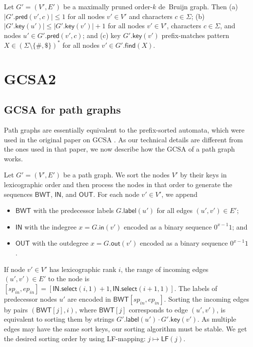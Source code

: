 \documentclass[a4paper,UKenglish]{lipics-v2016}
\newcommand{\set}[1]{\ensuremath{\{ #1 \}}}
\newcommand{\abs}[1]{\ensuremath{\lvert #1 \rvert}}
\newcommand{\select}{\ensuremath{\mathsf{select}}}
\newcommand{\LF}{\ensuremath{\mathsf{LF}}}
\newcommand{\find}{\ensuremath{\mathsf{find}}}
\newcommand{\gindegree}{\ensuremath{\mathsf{in}}}
\newcommand{\goutdegree}{\ensuremath{\mathsf{out}}}
\newcommand{\glabel}{\ensuremath{\mathsf{label}}}
\newcommand{\gpred}{\ensuremath{\mathsf{pred}}}
\newcommand{\gkey}{\ensuremath{\mathsf{key}}}
\newcommand{\orderk}[1]{order\nobreakdash-$#1$}
\newcommand{\LFmapping}{LF\nobreakdash-mapping}
\newcommand{\patternset}{\ensuremath{(\Sigma \setminus \set{\#, \$})^{\ast}}}
\newcommand{\BWT}{\ensuremath{\mathsf{BWT}}}
\newcommand{\bvIN}{\ensuremath{\mathsf{IN}}}
\newcommand{\bvOUT}{\ensuremath{\mathsf{OUT}}}
\begin{document}
\begin{lemma}\label{lemma:dbg-maximal}
Let $G' = (V', E')$ be a maximally pruned \orderk{k} de~Bruijn graph. Then
(a) $\abs{G'.\gpred(v', c)} \le 1$ for all nodes $v' \in V'$ and characters $c \in \Sigma$;
(b) $\abs{G'.\gkey(u')} \le \abs{G'.\gkey(v')}+1$ for all nodes $v' \in V'$, characters $c \in \Sigma$, and nodes $u' \in G'.\gpred(v', c)$; and
(c) key $G'.\gkey(v')$ prefix-matches pattern $X \in \patternset$ for all nodes $v' \in G'.\find(X)$.
\end{lemma}


\section{GCSA2}

\subsection{GCSA for path graphs}

Path graphs are essentially equivalent to the prefix-sorted automata, which were used in the original paper on GCSA \cite{Siren2014}. As our technical details are different from the ones used in that paper, we now describe how the GCSA of a path graph works.

Let $G' = (V', E')$ be a path graph. We sort the nodes $V'$ by their keys in lexicographic order and then process the nodes in that order to generate the sequences $\BWT$, $\bvIN$, and $\bvOUT$. For each node $v' \in V'$, we append
\begin{itemize}
\item $\BWT$ with the predecessor labels $G.\glabel(u')$ for all edges $(u', v') \in E'$;
\item $\bvIN$ with the indegree $x = G.\gindegree(v')$ encoded as a binary sequence $0^{x-1} 1$; and
\item $\bvOUT$ with the outdegree $x = G.\goutdegree(v')$ encoded as a binary sequence $0^{x-1} 1$.
\end{itemize}
If node $v' \in V'$ has lexicographic rank $i$, the range of incoming edges $(u', v') \in E'$ to the node is $[sp_{in}, ep_{in}] = [\bvIN.\select(i, 1) + 1, \bvIN.\select(i+1, 1)]$. The labels of predecessor nodes $u'$ are encoded in $\BWT[sp_{in}, ep_{in}]$. Sorting the incoming edges by pairs $(\BWT[j], i)$, where $\BWT[j]$ corresponds to edge $(u', v')$, is equivalent to sorting them by strings $G'.\glabel(u') \cdot G'.\gkey(v')$. As multiple edges may have the same sort keys, our sorting algorithm must be stable. We get the desired sorting order by using \LFmapping: $j \mapsto \LF(j)$.
\end{document}
